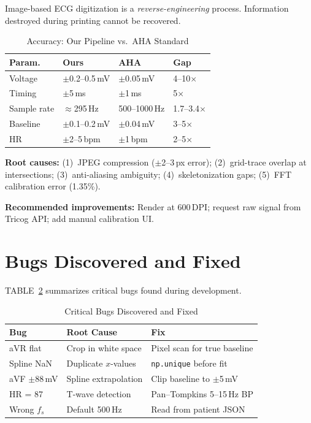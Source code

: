 \documentclass[conference]{IEEEtran}
\begin{document}
Image-based ECG digitization is a \textit{reverse-engineering} process.
Information destroyed during printing cannot be recovered.

\begin{table}[!h]
\centering
\caption{Accuracy: Our Pipeline vs.\ AHA Standard}
\label{tab:accuracy}
\footnotesize
\begin{tabular}{llll}
  \toprule
  \textbf{Param.} & \textbf{Ours} & \textbf{AHA} & \textbf{Gap} \\
  \midrule
  Voltage     & $\pm$0.2--0.5\,mV   & $\pm$0.05\,mV  & 4--10$\times$ \\
  Timing      & $\pm$5\,ms          & $\pm$1\,ms     & 5$\times$    \\
  Sample rate & $\approx$295\,Hz    & 500--1000\,Hz  & 1.7--3.4$\times$ \\
  Baseline    & $\pm$0.1--0.2\,mV   & $\pm$0.04\,mV  & 3--5$\times$ \\
  HR          & $\pm$2--5\,bpm      & $\pm$1\,bpm    & 2--5$\times$ \\
  \bottomrule
\end{tabular}
\end{table}

\textbf{Root causes:} (1)~JPEG compression ($\pm$2--3\,px error);
(2)~grid-trace overlap at intersections; (3)~anti-aliasing ambiguity;
(4)~skeletonization gaps; (5)~FFT calibration error (1.35\%).

\textbf{Recommended improvements:} Render at 600\,DPI; request raw signal
from Tricog API; add manual calibration UI.

\section{Bugs Discovered and Fixed}

TABLE~\ref{tab:bugs} summarizes critical bugs found during development.

\begin{table}[!t]
\centering
\caption{Critical Bugs Discovered and Fixed}
\label{tab:bugs}
\footnotesize
\begin{tabular}{p{1.6cm}p{2.8cm}p{2.8cm}}
  \toprule
  \textbf{Bug} & \textbf{Root Cause} & \textbf{Fix} \\
  \midrule
  aVR flat & Crop in white space & Pixel scan for true baseline \\[4pt]
  Spline NaN & Duplicate $x$-values & \texttt{np.unique} before fit \\[4pt]
  aVF $\pm$88\,mV & Spline extrapolation & Clip baseline to $\pm$5\,mV \\[4pt]
  HR = 87 & T-wave detection & Pan--Tompkins 5--15\,Hz BP \\[4pt]
  Wrong $f_s$ & Default 500\,Hz & Read from patient JSON \\
  \bottomrule
\end{tabular}
\end{table}
\end{document}
